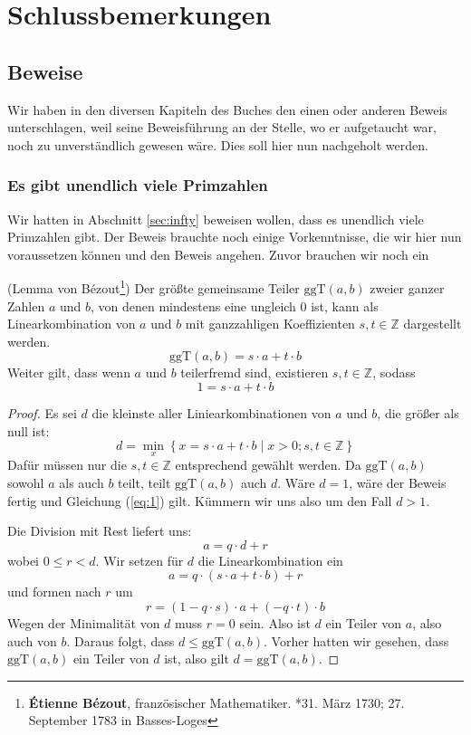 
\chapter{Schlussbemerkungen}

\section{Beweise}

Wir haben in den diversen Kapiteln des Buches den einen oder anderen Beweis unterschlagen, weil seine Beweisführung an der Stelle, wo er aufgetaucht war, noch zu unverständlich gewesen wäre. Dies soll hier nun nachgeholt werden.


\subsection{Es gibt unendlich viele Primzahlen}\label{chap:proofprime}
Wir hatten in Abschnitt \ref{sec:infty} beweisen wollen, dass es unendlich viele Primzahlen gibt. Der Beweis brauchte noch einige Vorkenntnisse, die wir hier nun voraussetzen können und den Beweis angehen. Zuvor brauchen wir noch ein

\begin{lemma}{(Lemma von Bézout\footnote{\textbf{Étienne Bézout}, französischer Mathematiker. *31. März 1730; 27. September 1783 in Basses-Loges})}
Der größte gemeinsame Teiler $\text{ggT}(a,b) $ zweier ganzer Zahlen $a$ und $b$, von denen mindestens eine ungleich 0 ist, kann als Linearkombination von $a$ und $b$ mit ganzzahligen Koeffizienten $s,t\in \mathbb{Z}$ dargestellt werden. 
\[
\text{ggT}(a,b) = s\cdot a+t\cdot b
\]
Weiter gilt, dass wenn $a$ und $b$ teilerfremd sind, existieren $s,t \in \mathbb{Z}$, sodass
\begin{equation}\label{eq:1}
1 = s\cdot a+t\cdot b
\end{equation}
\end{lemma}
\begin{proof}
Es sei $d$ die kleinste aller Liniearkombinationen von $a$ und $b$, die größer als null ist:
\[
d = \min_x \left\lbrace x = s\cdot a+t\cdot b \mid x>0; s,t\in \mathbb{Z} \right\rbrace
\]
Dafür müssen nur die $s,t\in \mathbb{Z}$ entsprechend gewählt werden. Da $\text{ggT}(a,b)$ sowohl $a$ als auch $b$ teilt, teilt $\text{ggT}(a,b)$ auch $d$. Wäre $d=1$, wäre der Beweis fertig und Gleichung (\ref{eq:1}) gilt. Kümmern wir uns also um den Fall $d>1$. 

Die Division mit Rest liefert uns:
\[
a = q\cdot d+r
\]
wobei $0\le r < d$. Wir setzen für $d$ die Linearkombination ein
\[
a = q\cdot(s\cdot a+t\cdot b)+r
\]
und formen nach $r$ um
\[
r = (1-q\cdot s)\cdot a+(-q\cdot t)\cdot b
\]
Wegen der Minimalität von $d$ muss $r=0$ sein. Also ist $d$ ein Teiler von $a$, also auch von $b$. Daraus folgt, dass $d\le \text{ggT}(a,b)$. Vorher hatten wir gesehen, dass $\text{ggT}(a,b)$ ein Teiler von $d$ ist, also gilt $d=\text{ggT}(a,b)$.
\end{proof}

